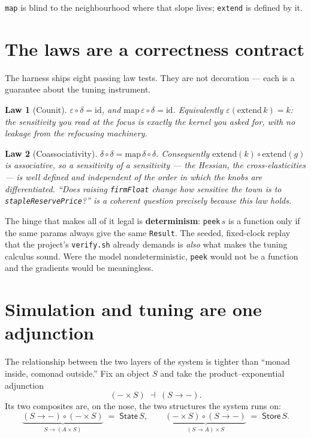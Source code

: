 \documentclass[11pt]{article}
\newtheorem{law}{Law}
\newcommand{\Store}{\mathsf{Store}}
\newcommand{\State}{\mathsf{State}}
\newcommand{\extract}{\varepsilon}
\newcommand{\duplicate}{\delta}
\begin{document}
\noindent \texttt{map} is blind to the neighbourhood where that slope lives;
\texttt{extend} is defined by it.

\section{The laws are a correctness contract}

The harness ships eight passing law tests. They are not decoration --- each is a
guarantee about the tuning instrument.

\begin{law}[Counit]
$\extract \circ \duplicate = \mathrm{id}$, and $\mathrm{map}\,\extract \circ
\duplicate = \mathrm{id}$. Equivalently $\extract(\mathrm{extend}\,k) = k$: the
sensitivity you read at the focus is \emph{exactly} the kernel you asked for, with
no leakage from the refocusing machinery.
\end{law}

\begin{law}[Coassociativity]
$\duplicate \circ \duplicate = \mathrm{map}\,\duplicate \circ \duplicate$.
Consequently $\mathrm{extend}(k) \circ \mathrm{extend}(g)$ is associative, so a
\emph{sensitivity of a sensitivity} --- the Hessian, the cross-elasticities ---
is well defined and independent of the order in which the knobs are
differentiated. ``Does raising \texttt{firmFloat} change how sensitive the town
is to \texttt{stapleReservePrice}?'' is a coherent question precisely because this
law holds.
\end{law}

\noindent The hinge that makes all of it legal is \textbf{determinism}:
\texttt{peek}\,$s$ is a function only if the same params always give the same
\texttt{Result}. The seeded, fixed-clock replay that the project's
\texttt{verify.sh} already demands is \emph{also} what makes the tuning calculus
sound. Were the model nondeterministic, \texttt{peek} would not be a function and
the gradients would be meaningless.

\section{Simulation and tuning are one adjunction}

The relationship between the two layers of the system is tighter than ``monad
inside, comonad outside.'' Fix an object $S$ and take the product--exponential
adjunction
\[
  (- \times S) \;\dashv\; (S \to -).
\]
Its two composites are, on the nose, the two structures the system runs on:
\[
  \underbrace{(S \to -)\circ(- \times S)}_{\textstyle S \to (A \times S)}
  \;=\; \State\,S,
  \qquad
  \underbrace{(- \times S)\circ(S \to -)}_{\textstyle (S \to A)\times S}
  \;=\; \Store\,S.
\]
\end{document}
